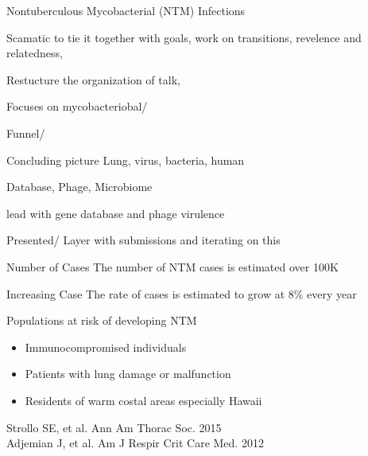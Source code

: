 \documentclass[11pt, xcolor=table]{beamer}
\begin{document}
	\begin{frame}{Nontuberculous Mycobacterial (NTM) Infections}
	
	  Scamatic to tie it together with goals, work on transitions, revelence and relatedness, 
	  
	  Restucture the organization of talk,
	  
	  Focuses on mycobacteriobal/
	  
	  Funnel/ 
	  
	  Concluding picture
	  Lung, virus, bacteria, human
	  
	  Database, Phage, Microbiome
	  
	  lead with gene database and phage virulence
	  
	  Presented/
	  Layer with submissions and iterating on this 
	  
	  
		\begin{block}{Number of Cases}
		The number of NTM cases is estimated over 100K
		\end{block}
		
		\begin{block}{Increasing Case}
		The rate of cases is estimated to grow at 8\% every year
		\end{block}
		
		
		\begin{block}{Populations at risk of developing NTM}
		\begin{itemize}
		\item Immunocompromised individuals 
		\item Patients with lung damage or malfunction 
		\item Residents of warm costal areas especially Hawaii
		\end{itemize}
		\end{block} 
		
		\begin{block}
		
		\end{block}
	\vspace{-1cm}
	\tiny{Strollo SE, et al. Ann Am Thorac Soc. 2015 \\
	Adjemian J, et al. Am J Respir Crit Care Med. 2012}
	
	\end{frame}
\end{document}
